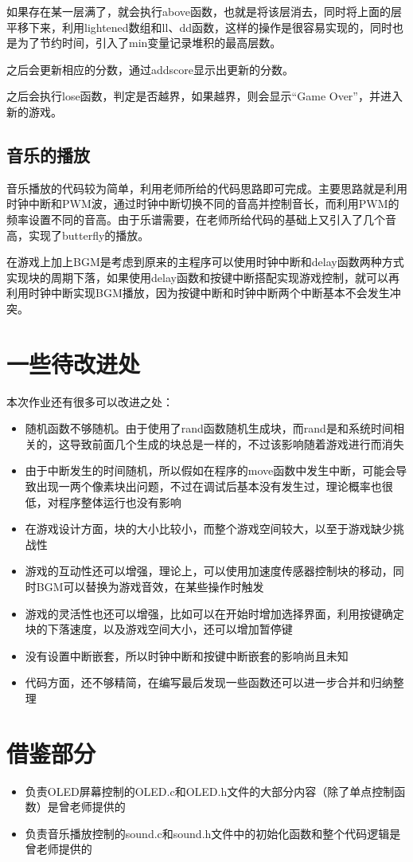 \documentclass[UTF8]{ctexart}
\begin{document}
如果存在某一层满了，就会执行above函数，也就是将该层消去，同时将上面的层平移下来，利用lightened数组和ll、dd函数，这样的操作是很容易实现的，同时也是为了节约时间，引入了min变量记录堆积的最高层数。

之后会更新相应的分数，通过addscore显示出更新的分数。

之后会执行lose函数，判定是否越界，如果越界，则会显示“Game Over”，并进入新的游戏。

\subsection{音乐的播放}
音乐播放的代码较为简单，利用老师所给的代码思路即可完成。主要思路就是利用时钟中断和PWM波，通过时钟中断切换不同的音高并控制音长，而利用PWM的频率设置不同的音高。由于乐谱需要，在老师所给代码的基础上又引入了几个音高，实现了butterfly的播放。

在游戏上加上BGM是考虑到原来的主程序可以使用时钟中断和delay函数两种方式实现块的周期下落，如果使用delay函数和按键中断搭配实现游戏控制，就可以再利用时钟中断实现BGM播放，因为按键中断和时钟中断两个中断基本不会发生冲突。

\section{一些待改进处}

本次作业还有很多可以改进之处：
\begin{itemize}
\item 随机函数不够随机。由于使用了rand函数随机生成块，而rand是和系统时间相关的，这导致前面几个生成的块总是一样的，不过该影响随着游戏进行而消失
\item 由于中断发生的时间随机，所以假如在程序的move函数中发生中断，可能会导致出现一两个像素块出问题，不过在调试后基本没有发生过，理论概率也很低，对程序整体运行也没有影响
\item 在游戏设计方面，块的大小比较小，而整个游戏空间较大，以至于游戏缺少挑战性
\item 游戏的互动性还可以增强，理论上，可以使用加速度传感器控制块的移动，同时BGM可以替换为游戏音效，在某些操作时触发
\item 游戏的灵活性也还可以增强，比如可以在开始时增加选择界面，利用按键确定块的下落速度，以及游戏空间大小，还可以增加暂停键
\item 没有设置中断嵌套，所以时钟中断和按键中断嵌套的影响尚且未知
\item 代码方面，还不够精简，在编写最后发现一些函数还可以进一步合并和归纳整理
\end{itemize}

\section{借鉴部分}
\begin{itemize}
\item 负责OLED屏幕控制的OLED.c和OLED.h文件的大部分内容（除了单点控制函数）是曾老师提供的
\item 负责音乐播放控制的sound.c和sound.h文件中的初始化函数和整个代码逻辑是曾老师提供的
\end{itemize}
\end{document}
